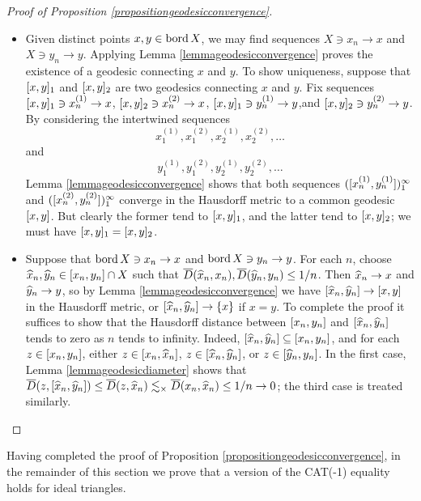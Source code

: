 \begin{proof}[Proof of Proposition \ref{propositiongeodesicconvergence}]~
\begin{itemize}
\item[(i)] Given distinct points $x,y\in\operatorname{bord} X$, we may find sequences $X\ni x_n\to x$ and $X\ni y_n\to y$. Applying Lemma \ref{lemmageodesicconvergence} proves the existence of a geodesic connecting $x$ and $y$. To show uniqueness, suppose that $[x,y]_1$ and $[x,y]_2$ are two geodesics connecting $x$ and $y$. Fix sequences $[x,y]_1\ni x_n^{(1)}\to x$, $[x,y]_2\ni x_n^{(2)}\to x$, $[x,y]_1\ni y_n^{(1)}\to y$,and $[x,y]_2\ni y_n^{(2)}\to y$. By considering the intertwined sequences 
\[
x_1^{(1)},x_1^{(2)},x_2^{(1)},x_2^{(2)},\ldots 
\]
and 
\[
y_1^{(1)},y_1^{(2)},y_2^{(1)},y_2^{(2)},\ldots
\] 
Lemma \ref{lemmageodesicconvergence} shows that both sequences $([x_n^{(1)},y_n^{(1)}])_1^\infty$ and $([x_n^{(2)},y_n^{(2)}])_1^\infty$ converge in the Hausdorff metric to a common geodesic $[x,y]$. But clearly the former tend to $[x,y]_1$, and the latter tend to $[x,y]_2$; we must have $[x,y]_1 = [x,y]_2$.


\item[(ii)] Suppose that $\operatorname{bord} X\ni x_n\to x$ and $\operatorname{bord} X\ni y_n\to y$. For each $n$, choose $\widehat x_n,\widehat y_n\in [x_n,y_n]\cap X$ such that $\overline{D}(\widehat x_n,x_n) , \overline{D}(\widehat y_n,y_n) \leq 1/n$. Then $\widehat x_n\to x$ and $\widehat y_n\to y$, so by Lemma \ref{lemmageodesicconvergence} we have $[\widehat x_n,\widehat y_n]\to [x,y]$ in the Hausdorff metric, or $[\widehat x_n,\widehat y_n] \to \{x\}$ if $x = y$. To complete the proof it suffices to show that the Hausdorff distance between $[x_n,y_n]$ and $[\widehat x_n,\widehat y_n]$ tends to zero as $n$ tends to infinity. Indeed, $[\widehat x_n,\widehat y_n] \subseteq [x_n,y_n]$, and for each $z\in [x_n,y_n]$, either $z\in [x_n,\widehat x_n]$, $z\in [\widehat x_n,\widehat y_n]$, or $z\in [\widehat y_n,y_n]$. In the first case, Lemma \ref{lemmageodesicdiameter} shows that $\overline{D}(z,[\widehat x_n,\widehat y_n]) \leq \overline{D}(z,\widehat x_n) \lesssim_\times \overline{D}(x_n,\widehat x_n) \leq 1/n \to 0$; the third case is treated similarly.

\end{itemize}
\end{proof}


Having completed the proof of Proposition \ref{propositiongeodesicconvergence}, in the remainder of this section we prove that a version of the CAT(-1) equality holds for ideal triangles.


